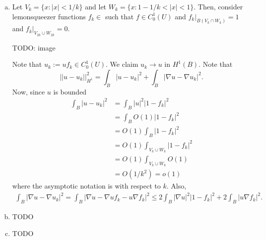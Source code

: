 \documentclass{article}
\newcommand{\D}{\nabla}
\begin{document}
\newpage
{} 
\tri
\hop 
\solution
\begin{enumerate}[(a)]
    \item Let $V_k = \{x : |x| < 1/k\}$ and let $W_k =\{x: 1- 1/k < |x| < 1\}$. Then, consider lemonsqueezer functions $f_k \in $ such that $f \in C_0^1(U)$ and $f_k|_{B(V_k \cap W_k)} = 1$ and $f_k|_{V_{2k} \cup W_{2k}} = 0$. 
    
    TODO: image

    Note that $u_k := uf_k \in C_0^1(U)$. We claim $u_k \to u$ in $H^1(B)$. Note that 
    \[||u-u_k||_{H^1}^2 = \int_B|u - u_k|^2+ \int_B|\D u -\D u_k|^2.\] 
    Now, since $u$ is bounded
    \begin{align*}
        \int_B |u - u_k|^2 &= \int_B|u|^2|1-f_k|^2 \\
        &= \int_BO(1)|1-f_k|^2 \\
        &=O(1) \int_B|1-f_k|^2 \\
        &=O(1) \int_{V_k \cup W_k}|1-f_k|^2 \\
        &=O(1) \int_{V_k \cup W_k}O(1) \\
        &=O(1/k^2)=o(1)
    \end{align*}
    where the asymptotic notation is with respect to $k$.
    Also, 
    \begin{align*}
        \int_B|\D u -\D u_k|^2 = \int_B|\D u -\D u f_k - u \D f_k |^2 \le 2\int_B|\D u|^2 |1-f_k|^2 + 2\int_B|u \D f_k|^2.
    \end{align*}
    \item TODO
    \item TODO
\end{enumerate}
\end{document}
